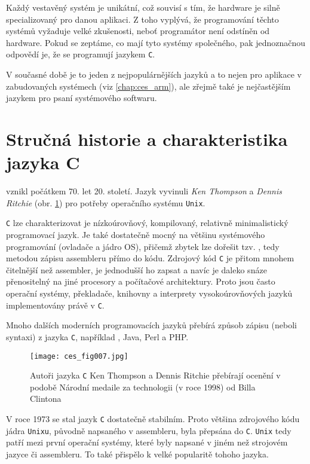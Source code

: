   Každý vestavěný systém je unikátní, což souvisí s tím, že hardware je silně specializovaný pro 
  danou aplikaci. Z toho vyplývá, že programování těchto systémů vyžaduje velké zkušenosti, neboť 
  programátor není odstíněn od hardware. Pokud se zeptáme, co mají tyto systémy společného, pak 
  jednoznačnou odpovědí je, že se programují jazykem \texttt{C}.
  
  V současné době je to jeden z nejpopulárnějších jazyků a to nejen pro aplikace v zabudovaných 
  systémech (viz \ref{chap:ces_arm}), ale zřejmě také je nejčastějším jazykem pro psaní systémového 
  softwaru.
  
  \section{Stručná historie a charakteristika jazyka  C}
    \wikiANSIC vznikl počátkem 70. let 20. století. Jazyk vyvinuli \emph{Ken Thompson} a 
    \emph{Dennis Ritchie} (obr. \ref{ces:fig007}) pro potřeby operačního systému \texttt{Unix}.  
    
    \texttt{C} lze charakterizovat je nízkoúrovňový, kompilovaný, relativně minimalistický 
    programovací jazyk. Je také dostatečně mocný na většinu systémového programování (ovladače a 
    jádro OS), přičemž zbytek lze dořešit tzv. \wikiInlineASM, tedy metodou zápisu assembleru přímo 
    do kódu. Zdrojový kód \texttt{C} je přitom mnohem čitelnější než assembler, je jednodušší ho 
    zapsat a navíc je daleko snáze přenositelný na jiné procesory a počítačové architektury. Proto 
    jsou často operační systémy, překladače, knihovny a interprety vysokoúrovňových jazyků 
    implementovány právě v \texttt{C}. 
    
    Mnoho dalších moderních programovacích jazyků přebírá způsob zápisu (neboli syntaxi) z jazyka 
    \texttt{C}, například \wikiCPP, Java, Perl a PHP.
  
    \begin{figure}[ht!]  %
      \centering
      \texttt{[image: ces\_fig007.jpg]}
      \caption{Autoři jazyka \texttt{C} Ken Thompson a Dennis Ritchie přebírají ocenění v podobě 
               Národní medaile za technologii (v roce 1998) od Billa Clintona}
      \label{ces:fig007}
    \end{figure}
    
    V roce 1973 se stal jazyk \texttt{C} dostatečně stabilním. Proto většina zdrojového kódu jádra 
    \texttt{Unixu}, původně napsaného v assembleru, byla přepsána do \texttt{C}. \texttt{Unix} tedy 
    patří mezi první operační systémy, které byly napsané v jiném než strojovém jazyce či 
    assembleru. To také přispělo k velké popularitě tohoho jazyka. 
    

